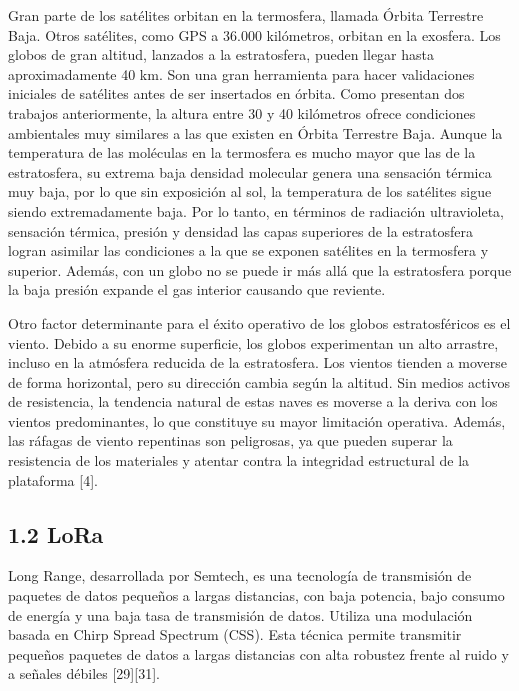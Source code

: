 \documentclass[12pt,a4paper]{article}
\begin{document}
Gran parte de los satélites orbitan en la termosfera, llamada Órbita Terrestre Baja. Otros satélites, como GPS a 36.000 kilómetros, orbitan en la exosfera. Los globos de gran altitud, lanzados a la estratosfera, pueden llegar hasta aproximadamente 40 km. Son una gran herramienta para hacer validaciones iniciales de satélites antes de ser insertados en órbita. Como presentan dos trabajos anteriormente, la altura entre 30 y 40 kilómetros ofrece condiciones ambientales muy similares a las que existen en Órbita Terrestre Baja. Aunque la temperatura de las moléculas en la termosfera es mucho mayor que las de la estratosfera, su extrema baja densidad molecular genera una sensación térmica muy baja, por lo que sin exposición al sol, la temperatura de los satélites sigue siendo extremadamente baja. Por lo tanto, en términos de radiación ultravioleta, sensación térmica, presión y densidad las capas superiores de la estratosfera logran asimilar las condiciones a la que se exponen satélites en la termosfera y superior. Además, con un globo no se puede ir más allá que la estratosfera porque la baja presión expande el gas interior causando que reviente.

Otro factor determinante para el éxito operativo de los globos estratosféricos es el viento. Debido a su enorme superficie, los globos experimentan un alto arrastre, incluso en la atmósfera reducida de la estratosfera. Los vientos tienden a moverse de forma horizontal, pero su dirección cambia según la altitud. Sin medios activos de resistencia, la tendencia natural de estas naves es moverse a la deriva con los vientos predominantes, lo que constituye su mayor limitación operativa. Además, las ráfagas de viento repentinas son peligrosas, ya que pueden superar la resistencia de los materiales y atentar contra la integridad estructural de la plataforma {[}4{]}.

\subsection{1.2 LoRa}\label{lora}

Long Range, desarrollada por Semtech, es una tecnología de transmisión de paquetes de datos pequeños a largas distancias, con baja potencia, bajo consumo de energía y una baja tasa de transmisión de datos. Utiliza una modulación basada en Chirp Spread Spectrum (CSS). Esta técnica permite transmitir pequeños paquetes de datos a largas distancias con alta robustez frente al ruido y a señales débiles {[}29{]}{[}31{]}.
\end{document}
